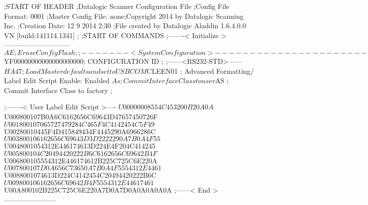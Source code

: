 ;START OF HEADER
;Datalogic Scanner Configuration File
;Config File Format: 0001
;Master Config File: none;Copyright 2014 by Datalogic Scanning Inc.
;Creation Date: 12 9 2014 2:30
;File created by Datalogic Aladdin 1.6.4.0.0 VN [build:141114.1341]
;
;START OF COMMANDS
;-------< Initialize >-----------------------------
$AE                 ; Erase Config Flash
;
;-------< System Configuration >-------------------------------
$YF00000000000000000000; CONFIGURATION ID
;
;------<RS232-STD>------
$HA47               ; Load Master defaults and set to USBCOM
$CLEEN01            ; Advanced Formatting/ Label Edit Script Enable: Enabled
$As                 ; Commit Interface Class to user
$AS                 ; Commit Interface Class to factory
;

;-------< User Label Edit Script >----
$U00000008554C453200B20A0A
$U000800107B0A6C6162656C69643D47657450726F
$U001800107065727479284C465F4C4142454C5F49
$U00280010445F4D415849434F4445290A6966286C
$U003800106162656C69643D3D2222290A7B0A4F55
$U0048001054312E446174613D224E4F204C414245
$U005800104C20494420222B6C6162656C69642B4F
$U006800105554312E446174612B225C725C6E220A
$U007800107D0A656C73650A7B0A4F5554312E4461
$U0088001074613D224C4142454C20494420222B6C
$U009800106162656C69642B4F5554312E44617461
$U00A800102B225C725C6E220A7D0A7D0A0A0A0A0A
;------< End >-----------------------
